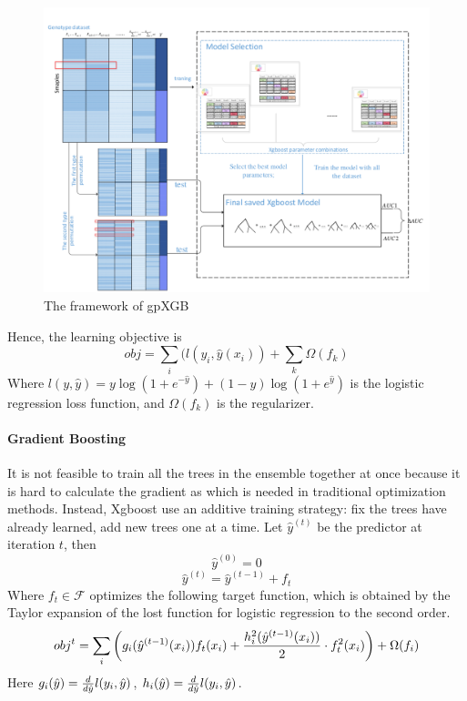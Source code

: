 \documentclass[11pt]{article}
\theoremstyle{plain}
\theoremstyle{definition}
\theoremstyle{remark}
\begin{document}
\begin{figure}[H]
    \begin{center}
       \includegraphics[scale=0.4]{framework_of_gpXGB}
    \end{center}
\caption{\label{fig1} The framework of gpXGB}
\end{figure}

Hence, the learning objective is
\begin{equation}
obj=\sum_i(l(y_i,\hat{y}(x_i))+\sum_k\Omega(f_k)
\end{equation}
Where $l(y,\hat{y})=y\log(1+e^{-\hat{y}})+(1-y)\log(1+e^{\hat{y}})$ is the logistic regression loss function, and $\Omega(f_k)$ is the regularizer.

\paragraph{Gradient Boosting}
It is not feasible to train all the trees in the ensemble together at once because it is hard to calculate the gradient as which is needed in traditional optimization methods. Instead, Xgboost use an additive training strategy: fix the trees have already learned, add new trees one at a time. Let $\hat{y}^{(t)}$ be the
predictor at iteration $t$, then
\begin{equation}
\hat{y}^{(0)}=0
\end{equation}
\begin{equation}
\hat{y}^{(t)}=\hat{y}^{(t-1)}+f_t
\end{equation}
Where $f_t\in\mathcal{F}$ optimizes the following target function, which is obtained by the Taylor expansion of the lost function for logistic regression to the second order.
\begin{equation}
obj^t=\sum_i\left(g_i(\hat{y}^{(t-1)}(x_i))f_t(x_i)+{h_i^2(\hat{y}^{(t-1)}(x_i))\over 2}\cdot f_t^2(x_i)\right)+\Omega(f_i)
\end{equation}
Here $g_i(\hat{y})={d\over d\hat{y}}l(y_i,\hat{y})$, $h_i(\hat{y})={d\over d\hat{y}}l(y_i,\hat{y})$.
\end{document}

